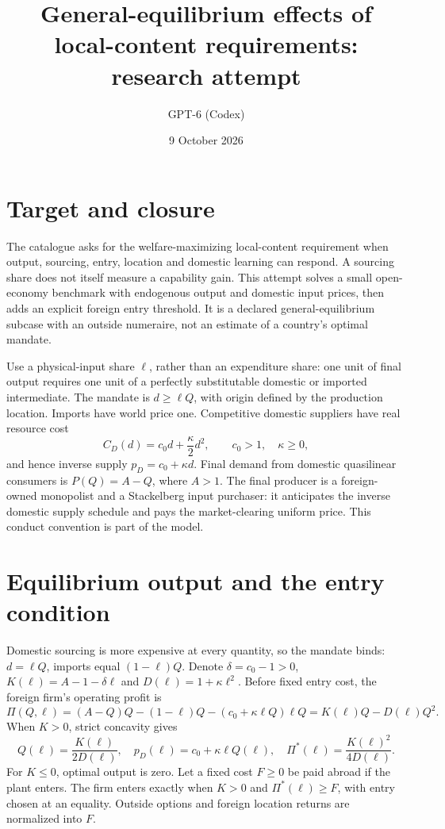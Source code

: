 \documentclass[11pt]{article}
\title{General-equilibrium effects of local-content requirements: research attempt}
\author{GPT-6 (Codex)}
\date{9 October 2026}
\begin{document}
\maketitle

\section*{Target and closure}
The catalogue asks for the welfare-maximizing local-content requirement when output, sourcing, entry, location and domestic learning can respond. A sourcing share does not itself measure a capability gain. This attempt solves a small open-economy benchmark with endogenous output and domestic input prices, then adds an explicit foreign entry threshold. It is a declared general-equilibrium subcase with an outside numeraire, not an estimate of a country's optimal mandate.

Use a physical-input share $\ell$, rather than an expenditure share: one unit of final output requires one unit of a perfectly substitutable domestic or imported intermediate. The mandate is $d\geq\ell Q$, with origin defined by the production location. Imports have world price one. Competitive domestic suppliers have real resource cost
\[
 C_D(d)=c_0d+\frac\kappa2d^2,\qquad c_0>1,\quad\kappa\geq0,
\]
and hence inverse supply $p_D=c_0+\kappa d$. Final demand from domestic quasilinear consumers is $P(Q)=A-Q$, where $A>1$. The final producer is a foreign-owned monopolist and a Stackelberg input purchaser: it anticipates the inverse domestic supply schedule and pays the market-clearing uniform price. This conduct convention is part of the model.

\section*{Equilibrium output and the entry condition}
Domestic sourcing is more expensive at every quantity, so the mandate binds: $d=\ell Q$, imports equal $(1-\ell)Q$. Denote $\delta=c_0-1>0$, $K(\ell)=A-1-\delta\ell$ and $D(\ell)=1+\kappa\ell^2$. Before fixed entry cost, the foreign firm's operating profit is
\[
 \Pi(Q,\ell)=(A-Q)Q-(1-\ell)Q-(c_0+\kappa\ell Q)\ell Q
 =K(\ell)Q-D(\ell)Q^2.
\]
When $K>0$, strict concavity gives
\[
 Q(\ell)=\frac{K(\ell)}{2D(\ell)},\quad
 p_D(\ell)=c_0+\kappa\ell Q(\ell),\quad
 \Pi^*(\ell)=\frac{K(\ell)^2}{4D(\ell)}. \tag{1}
\]
For $K\leq0$, optimal output is zero. Let a fixed cost $F\geq0$ be paid abroad if the plant enters. The firm enters exactly when $K>0$ and $\Pi^*(\ell)\geq F$, with entry chosen at an equality. Outside options and foreign location returns are normalized into $F$.
\end{document}
